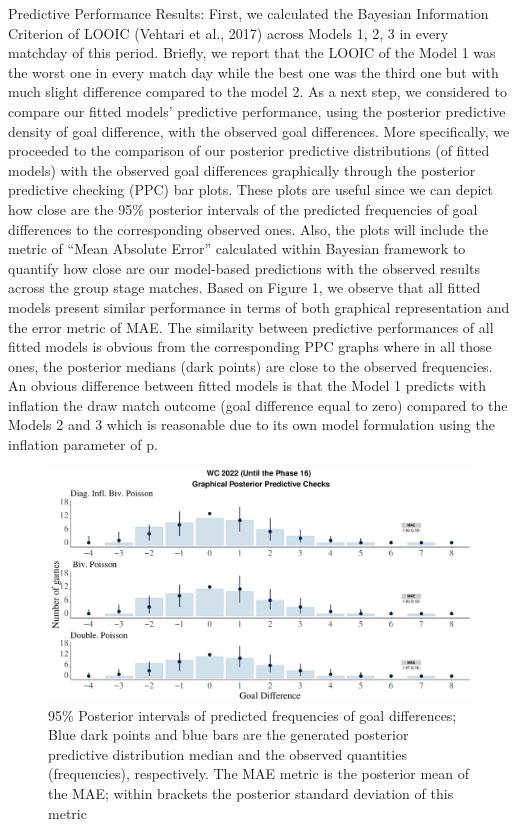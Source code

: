 \documentclass[
  10pt,
]{article}
\begin{document}
Predictive Performance Results:
First, we calculated the Bayesian Information Criterion of LOOIC (Vehtari et al., 2017) across Models 1, 2, 3 in every matchday of this period. Briefly, we report that the LOOIC of the Model 1 was the worst one in every match day while the best one was the third one but with much slight difference compared to the model 2.
As a next step, we considered to compare our fitted models’ predictive performance, using the posterior predictive density of goal difference, with the observed goal differences. More specifically, we proceeded to the comparison of our posterior predictive distributions (of fitted models) with the observed goal differences graphically through the posterior predictive checking (PPC) bar plots. These plots are useful since we can depict how close are the 95\% posterior intervals of the predicted frequencies of goal differences to the corresponding observed ones. Also, the plots will include the metric of “Mean Absolute Error” calculated within Bayesian framework to quantify how close are our model-based predictions with the observed results across the group stage matches.  Based on Figure 1, we observe that all fitted models present similar performance in terms of both graphical representation and the error metric of MAE. The similarity between predictive performances of all fitted models is obvious from the corresponding PPC graphs where in all those ones, the posterior medians (dark points) are close to the observed frequencies. An obvious difference between fitted models is that the Model 1 predicts with inflation the draw match outcome (goal difference equal to zero) compared to the Models 2 and 3 which is reasonable due to its own model formulation using the inflation parameter of p. 


\begin{center}
\begin{figure}
 \includegraphics[width=0.8\linewidth]{WC_2022_Out_Sample_PPC.pdf}
\caption{95\% Posterior intervals of predicted frequencies of goal differences; Blue dark points and blue bars are the generated posterior predictive distribution median and the observed quantities (frequencies), respectively. The MAE metric is the posterior mean of the MAE; within brackets the posterior standard deviation of this metric} 
 \end{figure}
  \end{center}
\end{document}
